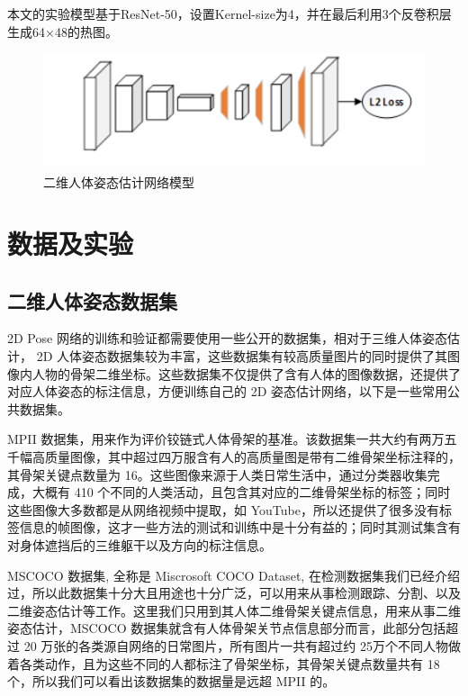 本文的实验模型基于ResNet-50，设置Kernel-size为4，并在最后利用3个反卷积层生成64×48的热图。

\begin{figure}[h]
	\centering
	\includegraphics[scale=0.8]{figures/19.png}
	\caption{二维人体姿态估计网络模型\textsuperscript{\cite{p25}}}
	\label{fig:f19}
\end{figure}



\section{数据及实验}
\subsection{二维人体姿态数据集}{}

2D Pose 网络的训练和验证都需要使用一些公开的数据集，相对于三维人体姿态估计， 2D 人体姿态数据集较为丰富，这些数据集有较高质量图片的同时提供了其图像内人物的骨架二维坐标。这些数据集不仅提供了含有人体的图像数据，还提供了对应人体姿态的标注信息，方便训练自己的 2D 姿态估计网络，以下是一些常用公共数据集。

MPII 数据集，用来作为评价铰链式人体骨架的基准。该数据集一共大约有两万五千幅高质量图像，其中超过四万服含有人的高质量图是带有二维骨架坐标注释的，其骨架关键点数量为 16。这些图像来源于人类日常生活中，通过分类器收集完成，大概有 410 个不同的人类活动，且包含其对应的二维骨架坐标的标签；同时这些图像大多数都是从网络视频中提取，如 YouTube，所以还提供了很多没有标签信息的帧图像，这才一些方法的测试和训练中是十分有益的；同时其测试集含有对身体遮挡后的三维躯干以及方向的标注信息。

MSCOCO 数据集, 全称是 Miscrosoft COCO Dataset, 在检测数据集我们已经介绍过，所以此数据集十分大且用途也十分广泛，可以用来从事检测跟踪、分割、以及二维姿态估计等工作。这里我们只用到其人体二维骨架关键点信息，用来从事二维姿态估计，MSCOCO 数据集就含有人体骨架关节点信息部分而言，此部分包括超过 20 万张的各类源自网络的日常图片，所有图片一共有超过约 25万个不同人物做着各类动作，且为这些不同的人都标注了骨架坐标，其骨架关键点数量共有 18 个，所以我们可以看出该数据集的数据量是远超 MPII 的。

